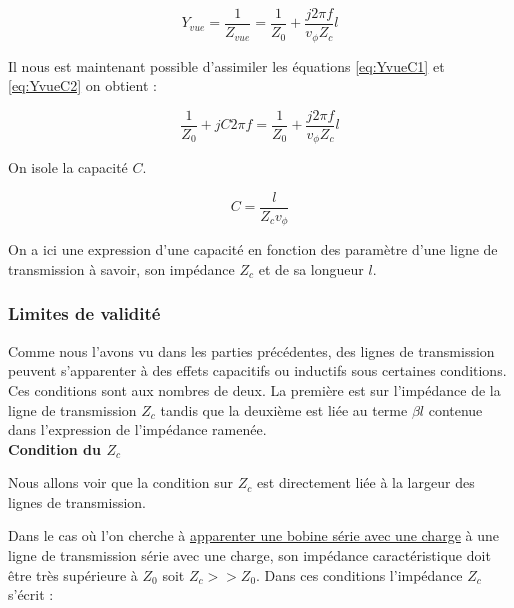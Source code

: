 \documentclass[french]{article}
\begin{document}
\begin{equation}
	Y_{vue} = \frac{1}{Z_{vue}} = \frac{1}{Z_0} + \frac{j 2\pi f}{v_\phi Z_c} l
	\label{eq:YvueC2}
\end{equation}

Il nous est maintenant possible d'assimiler les équations \ref{eq:YvueC1} et \ref{eq:YvueC2} on obtient :

\begin{equation}
	\frac{1}{Z_0} + j C 2 \pi f = \frac{1}{Z_0} + \frac{j 2\pi f}{v_\phi Z_c} l
\end{equation}

On isole la capacité $C$.

\begin{equation}
	C = \frac{l}{Z_c v_\phi}
	\label{eq:resultat_C}
\end{equation}

On a ici une expression d'une capacité en fonction des paramètre d'une ligne de transmission à savoir, son impédance $Z_c$ et de sa longueur $l$. 


\subsubsection{Limites de validité}

Comme nous l'avons vu dans les parties précédentes, des lignes de transmission peuvent s'apparenter à des effets capacitifs ou inductifs sous certaines conditions. Ces conditions sont aux nombres de deux. La première est sur l'impédance de la ligne de transmission $Z_c$ tandis que la deuxième est liée au terme $\beta l$ contenue dans l'expression de l'impédance ramenée.\\

\textbf{Condition du $Z_c$\\}

Nous allons voir que la condition sur $Z_c$ est directement liée à la largeur des lignes de transmission.

Dans le cas où l'on cherche à \underline{apparenter une bobine série avec une charge} à une ligne de transmission série avec une charge, son impédance caractéristique doit être très supérieure à $Z_0$ soit $Z_c >> Z_0$. Dans ces conditions l'impédance $Z_c$ s'écrit :
\end{document}
